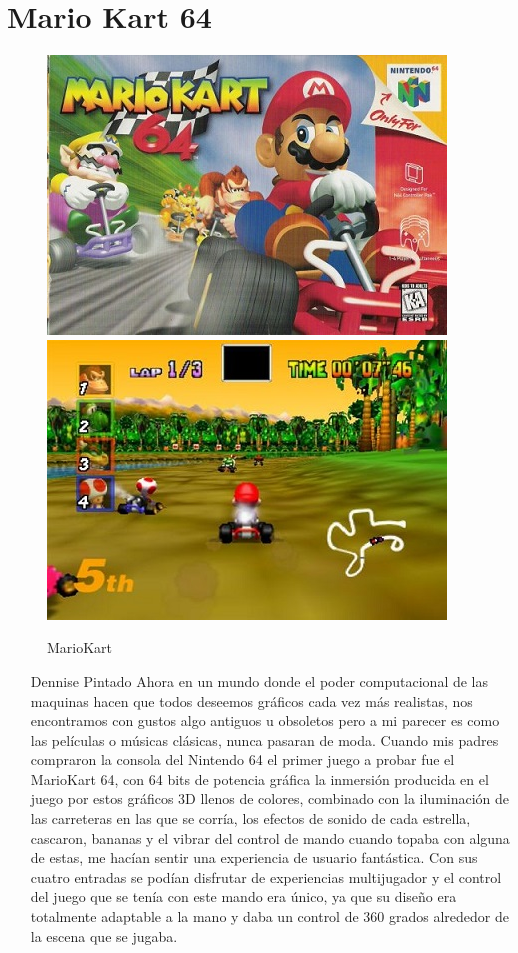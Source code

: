 \section{Mario Kart 64}

\begin{figure}[htbp]
\begin{center}
\includegraphics[width=.60\textwidth]{./imagenes/kart1.jpg} \includegraphics[width=.60\textwidth]{./imagenes/kart2.jpg} 
\caption{MarioKart}
\label{Mario Kart}
\end{center}
\end{figure}

\begin{itemize}
\item[Dennise Pintado] Ahora en un mundo donde el poder computacional de las maquinas hacen que todos deseemos  gráficos cada vez más realistas, nos encontramos con gustos algo antiguos u obsoletos pero a mi parecer es como las películas o músicas clásicas, nunca pasaran de moda. Cuando mis padres compraron la consola del Nintendo 64 el primer juego a probar fue el MarioKart 64,  con  64 bits de potencia gráfica la inmersión producida en el juego  por estos gráficos 3D llenos de colores, combinado con la iluminación de las carreteras en las que se corría, los efectos de sonido de cada estrella, cascaron, bananas  y el vibrar del control de mando cuando topaba con alguna de estas, me hacían sentir una experiencia de usuario fantástica. Con sus cuatro entradas se podían disfrutar de experiencias multijugador y el  control del juego que se tenía con este  mando era único, ya que su diseño era totalmente adaptable a la mano y daba un control de 360 grados alrededor de la escena que se jugaba.  
\end{itemize}